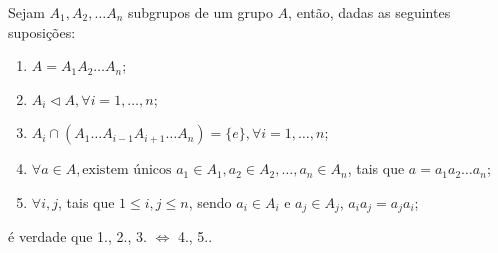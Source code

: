 \documentclass[11pt,openany]{book}
\begin{document}
\begin{lemma}
\label{lemma:comutabilidade_produto_direto}
    Sejam $A_1, A_2, \dots A_n$ subgrupos de um grupo $A$, então, dadas as seguintes suposições:
    \begin{enumerate}
        \item $A = A_1A_2 \dots A_n$;
        \item $A_i \triangleleft A, \forall i = 1, \dots, n$;
        \item $A_i \cap (A_1 \dots A_{i-1}A_{i+1}\dots A_n) = \{e\}, \forall i = 1, \dots, n$;
        \item $\forall a \in A, \text{existem únicos } a_1 \in A_1, a_2 \in A_2, \dots, a_n \in A_n$, tais que $a = a_1a_2\dots a_n$;
        \item $\forall i, j$, tais que $1 \leq i, j \leq n$, sendo $a_i \in A_i$ e $a_j \in A_j$, $a_ia_j = a_ja_i$;
    \end{enumerate}
    é verdade que 1., 2., 3. $\Leftrightarrow$ 4., 5..
\end{lemma}
\end{document}
